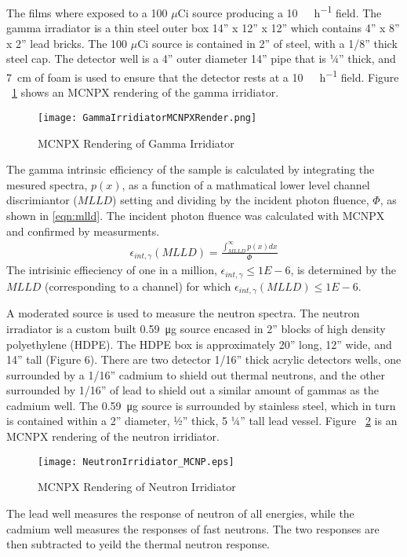 \documentclass[draftcls,onecolumn]{IEEEtran}
\begin{document}
 The films where exposed to a 100 $\mu$Ci  source producing a \SI{10}{\milli\roetgen\per\hour} field. 
The gamma irradiator is a thin steel outer box 14” x 12” x 12” which contains 4” x 8” x 2” lead bricks.  
The 100 $\mu$Ci  source is contained in 2” of steel, with a 1/8” thick steel cap.  
The detector well is a 4” outer diameter 14” pipe that is ¼” thick, and \SI{7}{\cm} of foam is used to ensure that the detector rests at a \SI{10}{\milli\roetgen\per\hour} field. 
Figure ~\ref{fig:gammaIrridiator} shows an MCNPX rendering of the gamma irridiator.
\begin{figure}[ht]
	\centering
	\texttt{[image: GammaIrridiatorMCNPXRender.png]}
	\caption{MCNPX Rendering of Gamma Irridiator}
	\label{fig:gammaIrridiator}
\end{figure}
The gamma intrinsic efficiency of the sample is calculated by integrating the mesured spectra, $p(x)$, as a function of a mathmatical lower level channel discrimiantor ($MLLD$) setting and dividing by the incident photon fluence, $\Phi$, as shown in \eqref{eqn:mlld}.
The incident photon fluence was calculated with MCNPX and confirmed by measurments.
\begin{align}
	\label{eqn:mlld}
	\epsilon_{int,\gamma} \left(MLLD\right) = \frac{\int_{MLLD}^\infty p(x)dx}{\Phi} 
\end{align}
The intrisinic effieciency of one in a million, $\epsilon_{int,\gamma} \le \si{1E-6}$, is determined by the $MLLD$ (corresponding to a channel) for which $\epsilon_{int,\gamma} \left(MLLD\right) \le \si{1E-6}$.

A moderated  source is used to measure the neutron spectra.
The neutron irradiator is a custom built \SI{0.59}{\ug} source encased in 2” blocks of high density polyethylene (HDPE).
The HDPE box is approximately 20” long, 12” wide, and 14” tall (Figure 6).
There are two detector 1/16” thick acrylic detectors wells, one surrounded by a 1/16” cadmium to shield out thermal neutrons, and the other surrounded by 1/16” of lead to shield out a similar amount of gammas as the cadmium well.
The \SI{0.59}{\ug} source is surrounded by stainless steel, which in turn is contained within a 2” diameter, ½” thick, 5 ¼” tall lead vessel. 
Figure ~\ref{fig:neutronIrridiator} is an MCNPX rendering of the neutron irridiator.
\begin{figure}[ht]
	\centering
	\texttt{[image: NeutronIrridiator\_MCNP.eps]}
	\caption{MCNPX Rendering of Neutron Irridiator}
	\label{fig:neutronIrridiator}
\end{figure}
The lead well measures the response of neutron of all energies, while the cadmium well measures the responses of fast neutrons.
The two responses are then subtracted to yeild the thermal neutron response.
\end{document}
